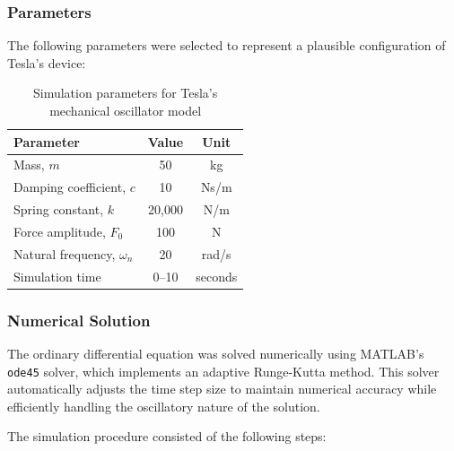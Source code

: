 \documentclass[12pt,a4paper]{article}
\begin{document}
\subsubsection*{Parameters}
The following parameters were selected to represent a plausible configuration of Tesla's device:

\begin{table}[h]
\centering
\caption{Simulation parameters for Tesla's mechanical oscillator model}
\begin{tabular}{@{}lcc@{}}
\toprule
\textbf{Parameter} & \textbf{Value} & \textbf{Unit} \\
\midrule
Mass, $m$ & 50 & kg \\
Damping coefficient, $c$ & 10 & Ns/m \\
Spring constant, $k$ & 20,000 & N/m \\
Force amplitude, $F_0$ & 100 & N \\
Natural frequency, $\omega_n$ & 20 & rad/s \\
Simulation time & 0--10 & seconds \\
\bottomrule
\end{tabular}
\end{table}

\subsubsection*{Numerical Solution}
The ordinary differential equation was solved numerically using MATLAB's \texttt{ode45} solver, which implements an adaptive Runge-Kutta method. This solver automatically adjusts the time step size to maintain numerical accuracy while efficiently handling the oscillatory nature of the solution.

The simulation procedure consisted of the following steps:
\end{document}
